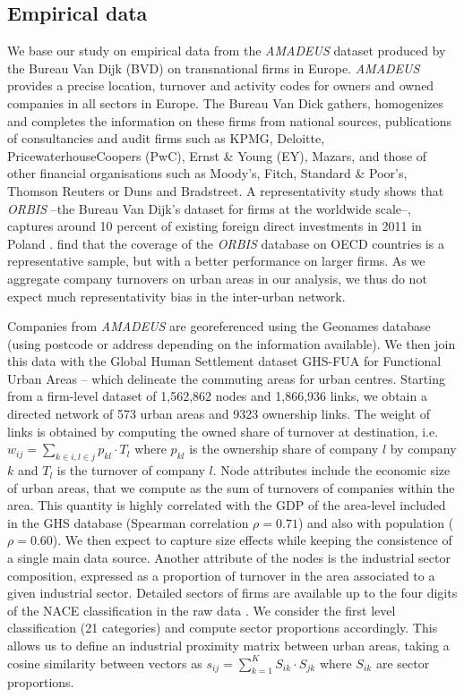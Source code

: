 \documentclass[10pt,letterpaper]{article}
\begin{document}
\subsection*{Empirical data}

We base our study on empirical data from the \emph{AMADEUS} dataset produced by the Bureau Van Dijk (BVD) on transnational firms in Europe. \emph{AMADEUS} provides a precise location, turnover and activity codes for owners and owned companies in all sectors in Europe. The Bureau Van Dick gathers, homogenizes and completes the information on these firms from national sources, publications of consultancies and audit firms such as KPMG, Deloitte, PricewaterhouseCoopers (PwC), Ernst \& Young (EY), Mazars, and those of other financial organisations such as Moody's, Fitch, Standard \& Poor's, Thomson Reuters or Duns and Bradstreet. A representativity study shows that \emph{ORBIS} --the Bureau Van Dijk's dataset for firms at the worldwide scale--, captures around 10 percent of existing foreign direct investments in 2011 in Poland \cite{Zdanowska2018}. \cite{bajgar2020coverage} find that the coverage of the \emph{ORBIS} database on OECD countries is a representative sample, but with a better performance on larger firms. As we aggregate company turnovers on urban areas in our analysis, we thus do not expect much representativity bias in the inter-urban network.

Companies from \emph{AMADEUS} are georeferenced using the Geonames database (using postcode or address depending on the information available). We then join this data with the Global Human Settlement dataset GHS-FUA for Functional Urban Areas \cite{Florczyk2019ghs} -- which delineate the commuting areas for urban centres. Starting from a firm-level dataset of 1,562,862 nodes and 1,866,936 links, we obtain a directed network of 573 urban areas and 9323 ownership links. The weight of links is obtained by computing the owned share of turnover at destination, i.e. $w_{ij} = \sum_{k \in i,l \in j} p_{kl} \cdot T_l$ where $p_{kl}$ is the ownership share of company $l$ by company $k$ and $T_l$ is the turnover of company $l$. Node attributes include the economic size of urban areas, that we compute as the sum of turnovers of companies within the area. This quantity is highly correlated with the GDP of the area-level included in the GHS database (Spearman correlation $\rho = 0.71$) and also with population ($\rho = 0.60$). We then expect to capture size effects while keeping the consistence of a single main data source. Another attribute of the nodes is the industrial sector composition, expressed as a proportion of turnover in the area associated to a given industrial sector. Detailed sectors of firms are available up to the four digits of the NACE classification in the raw data \cite{EUROSTAT2008}. We consider the first level classification (21 categories) and compute sector proportions accordingly. This allows us to define an industrial proximity matrix between urban areas, taking a cosine similarity between vectors as $s_{ij} = \sum_{k=1}^{K} S_{ik}\cdot S_{jk}$ where $S_{ik}$ are sector proportions.
\end{document}
